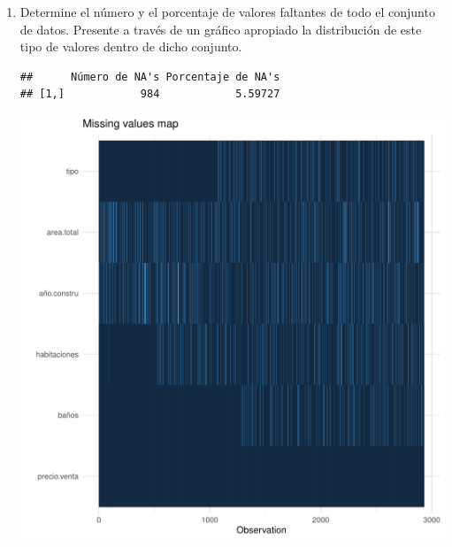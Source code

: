 \documentclass[9pt,letterpaper]{article}\usepackage[]{graphicx}\usepackage[]{color}
\makeatletter
\def\maxwidth{ %
  \ifdim\Gin@nat@width>\linewidth
    \linewidth
  \else
    \Gin@nat@width
  \fi
}
\newenvironment{kframe}{%
 \def\at@end@of@kframe{}%
 \ifinner\ifhmode%
  \def\at@end@of@kframe{\end{minipage}}%
  \begin{minipage}{\columnwidth}%
 \fi\fi%
 \def\FrameCommand##1{\hskip\@totalleftmargin \hskip-\fboxsep
 \colorbox{shadecolor}{##1}\hskip-\fboxsep
     \hskip-\linewidth \hskip-\@totalleftmargin \hskip\columnwidth}%
 \MakeFramed {\advance\hsize-\width
   \@totalleftmargin\z@ \linewidth\hsize
   \@setminipage}}%
 {\par\unskip\endMakeFramed%
 \at@end@of@kframe}
\newenvironment{knitrout}{}{} %
\makeatother
\begin{document}
\begin{enumerate}
    \item  Determine el número y el porcentaje de valores faltantes de todo el conjunto de datos. Presente a través de un gráfico apropiado la distribución de este tipo de valores dentro de dicho conjunto.
\begin{knitrout}
\color{fgcolor}\begin{kframe}
\begin{verbatim}
##      Número de NA's Porcentaje de NA's
## [1,]            984            5.59727
\end{verbatim}
\end{kframe}
\includegraphics[width=\maxwidth]{figure/unnamed-chunk-3-1} 

\end{knitrout}
    

\end{enumerate}
\end{document}
